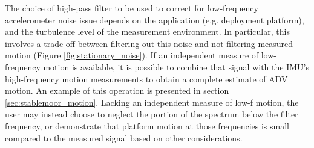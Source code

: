 \documentclass[twocol]{ametsoc}
\begin{document}


The choice of high-pass filter to be used to correct for low-frequency accelerometer noise issue depends on the application (e.g. deployment platform), and the turbulence level of the measurement environment. In particular, this involves a trade off between filtering-out this noise and not filtering measured motion (Figure \ref{fig:stationary_noise}). If an independent measure of low-frequency motion is available, it is possible to combine that signal with the IMU's high-frequency motion measurements to obtain a complete estimate of ADV motion. An example of this operation is presented in section \ref{sec:stablemoor_motion}. Lacking an independent measure of low-f motion, the user may instead choose to neglect the portion of the spectrum below the filter frequency, or demonstrate that platform motion at those frequencies is small compared to the measured signal based on other considerations. 
\end{document}
